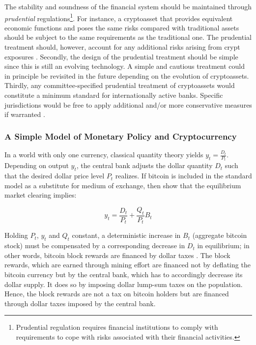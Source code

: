 \documentclass[12pt]{article}
\newcommand{\1}{\mathbbm 1}
\begin{document}
		The stability and soundness of the financial system should be maintained through \textit{prudential} regulations\footnote{Prudential regulation requires financial institutions to comply with requirements to cope with risks associated with their financial activities.}. For instance, a cryptoasset  that  provides  equivalent  economic functions and poses the same risks compared with traditional assets should be subject to the same requirements  as  the  traditional  one.  The prudential treatment should, however, account for any additional risks arising from crypt exposures \cite{basel2021prudential}. Secondly, the   design   of   the   prudential   treatment should be simple since this is  still an  evolving technology. A simple and cautious treatment could in principle  be revisited in the future depending on the evolution of cryptoassets. Thirdly, any  committee-specified  prudential  treatment  of  cryptoassets  would  constitute  a  minimum  standard  for  internationally  active  banks.  Specific jurisdictions  would  be  free  to  apply  additional  and/or  more  conservative  measures  if  warranted \cite{basel2021prudential}.
		
		
		
		
	\subsubsection{A Simple Model of Monetary Policy and Cryptocurrency}
	
	 In a world with only one currency, classical quantity theory yields $y_{t} = \frac{D_{t}}{P_{t}}$. Depending on output $y_{t}$, the central bank adjusts the dollar quantity $D_{t}$ such that the desired dollar price level $P_{t}$ realizes. If bitcoin is included in the standard model as a substitute for medium of exchange, then \cite{schilling2019some} show that the equilibrium market clearing implies:
	
	\begin{equation}
		y_{t} = \frac{D_{t}}{P_{t}} + \frac{Q_{t}}{P_{t}} B_{t}
	\end{equation}


Holding $P_{t}$, $y_{t}$ and $Q_{t}$ constant, a deterministic increase in $B_{t}$ (aggregate bitcoin stock) must be compensated by a corresponding decrease in $D_{t}$ in equilibrium; in other words, bitcoin block rewards are financed by dollar taxes \cite{schilling2019some}. The block rewards, which are earned through mining effort are financed not by deflating the bitcoin currency but by the central bank, which has to accordingly decrease its dollar supply. It does so by imposing dollar lump-sum taxes on the population. Hence, the block rewards are not a tax on bitcoin holders but are financed through dollar taxes imposed by the central bank.
\end{document}
